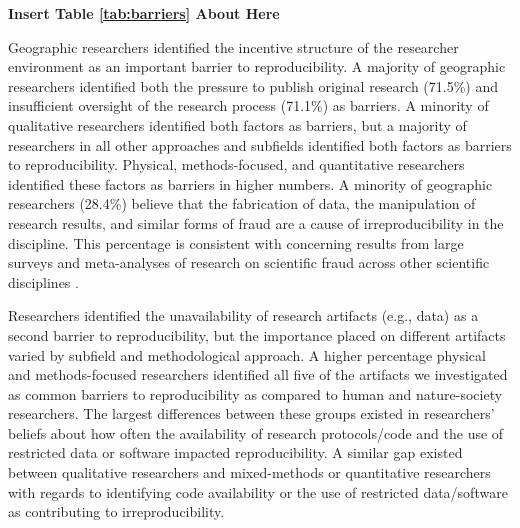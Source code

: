 \documentclass[]{interact}
\theoremstyle{plain}%
\theoremstyle{definition}
\theoremstyle{remark}
\begin{document}
\begin{center}
\textbf{Insert Table \ref{tab:barriers} About Here}
\end{center}

Geographic researchers identified the incentive structure of the researcher environment as an important barrier to reproducibility.
A majority of geographic researchers identified both the pressure to publish original research (71.5\%) and insufficient oversight of the research process (71.1\%) as barriers.
A minority of qualitative researchers identified both factors as barriers, but a majority of researchers in all other approaches and subfields identified both factors as barriers to reproducibility.
Physical, methods-focused, and quantitative researchers identified these factors as barriers in higher numbers. 
A minority of geographic researchers (28.4\%) believe that the fabrication of data, the manipulation of research results, and similar forms of fraud are a cause of irreproducibility in the discipline.
This percentage is consistent with concerning results from large surveys and meta-analyses of research on scientific fraud across other scientific disciplines \citep{fanelli2009many, baker20161}.

Researchers identified the unavailability of research artifacts (e.g., data) as a second barrier to reproducibility, but the importance placed on different artifacts varied by subfield and methodological approach.
A higher percentage physical and methods-focused researchers identified all five of the artifacts we investigated as common barriers to reproducibility as compared to human and nature-society researchers.
The largest differences between these groups existed in researchers' beliefs about how often the availability of research protocols/code and the use of restricted data or software impacted reproducibility.
A similar gap existed between qualitative researchers and mixed-methods or quantitative researchers with regards to identifying code availability or the use of restricted data/software as contributing to irreproducibility.
\end{document}
